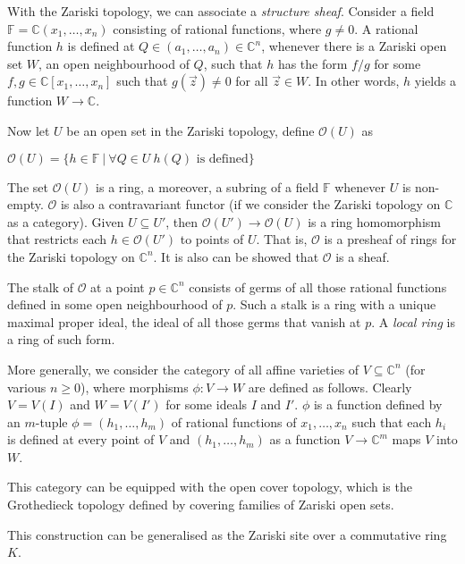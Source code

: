 \documentclass[a4paper]{article}
\theoremstyle{defin}
\theoremstyle{theorem}
\theoremstyle{claim}
\theoremstyle{prop}
\theoremstyle{lemma}
\theoremstyle{fact}
\theoremstyle{ex}
\theoremstyle{col}
\begin{document}
With the Zariski topology, we can associate a \emph{structure sheaf}. Consider a field $\mathbb{F} = \mathbb{C}(x_1, \dots, x_n)$ consisting of rational functions, where $g \neq 0$. A rational function $h$ is defined at $Q \in (a_1, \dots, a_n) \in \mathbb{C}^n$, whenever there is a Zariski open set $W$, an open neighbourhood of $Q$, such that $h$ has the form $f/g$ for some $f, g \in \mathbb{C}[x_1, \dots, x_n]$ such that $g(\vec{z}) \neq 0$ for all $\vec{z} \in W$. In other words, $h$ yields a function $W \to \mathbb{C}$.

Now let $U$ be an open set in the Zariski topology, define $\mathcal{O}(U)$ as
\begin{center}
$\mathcal{O}(U) = \{ h \in \mathbb{F} \: | \: \forall Q \in U \: \text{$h(Q)$ is defined} \}$
\end{center}
The set $\mathcal{O}(U)$ is a ring, a moreover, a subring of a field $\mathbb{F}$ whenever $U$ is non-empty. $\mathcal{O}$ is also a contravariant functor (if we consider the Zariski topology on $\mathbb{C}$ as a category). Given $U \subseteq U'$, then $\mathcal{O}(U') \to \mathcal{O}(U)$ is a ring homomorphism that restricts each $h \in \mathcal{O}(U')$ to points of $U$. That is, $\mathcal{O}$ is a presheaf of rings for the Zariski topology on $\mathbb{C}^n$. It is also can be showed that $\mathcal{O}$ is a sheaf.

The stalk of $\mathcal{O}$ at a point $p \in \mathbb{C}^n$ consists of germs of all those rational functions defined in some open neighbourhood of $p$. Such a stalk is a ring with a unique maximal proper ideal, the ideal of all those germs that vanish at $p$. A \emph{local ring} is a ring of such form.

More generally, we consider the category of all affine varieties of $V \subseteq \mathbb{C}^n$ (for various $n \geq 0$), where morphisms $\phi : V \to W$ are defined as follows. Clearly $V = V(I)$ and $W = V(I')$ for some ideals $I$ and $I'$. $\phi$ is a function defined by an $m$-tuple $\phi = (h_1, \dots, h_m)$ of rational functions of $x_1, \dots, x_n$ such that each $h_i$ is defined at every point of $V$ and $(h_1, \dots, h_m)$ as a function $V \to \mathbb{C}^m$ maps $V$ into $W$.

This category can be equipped with the open cover topology, which is the Grothedieck topology defined by covering families of Zariski open sets.

This construction can be generalised as the Zariski site over a commutative ring $K$.
\end{document}

